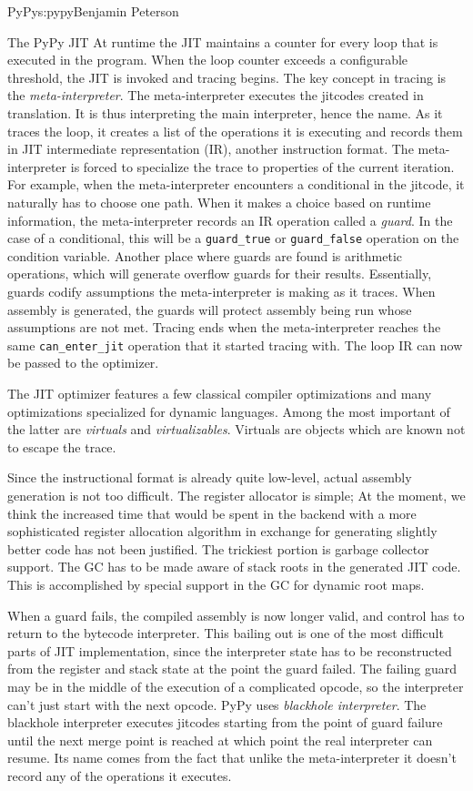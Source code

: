 \begin{aosachapter}{PyPy}{s:pypy}{Benjamin Peterson}
\begin{aosasect1}{The PyPy JIT}
At runtime the JIT maintains a counter for every loop that is executed in the
program. When the loop counter exceeds a configurable threshold, the JIT is
invoked and tracing begins. The key concept in tracing is the
\emph{meta-interpreter}. The meta-interpreter executes the jitcodes created in
translation. It is thus interpreting the main interpreter, hence the name. As it
traces the loop, it creates a list of the operations it is executing and records
them in JIT intermediate representation (IR), another instruction format. The
meta-interpreter is forced to specialize the trace to properties of the current
iteration. For example, when the meta-interpreter encounters a conditional in
the jitcode, it naturally has to choose one path. When it makes a choice based
on runtime information, the meta-interpreter records an IR operation called a
\emph{guard}. In the case of a conditional, this will be a \verb+guard_true+ or
\verb+guard_false+ operation on the condition variable. Another place where
guards are found is arithmetic operations, which will generate overflow guards
for their results. Essentially, guards codify assumptions the meta-interpreter
is making as it traces. When assembly is generated, the guards will protect
assembly being run whose assumptions are not met. Tracing ends when the
meta-interpreter reaches the same \verb+can_enter_jit+ operation that it started
tracing with. The loop IR can now be passed to the optimizer.

The JIT optimizer features a few classical compiler optimizations and many
optimizations specialized for dynamic languages. Among the most important of the
latter are \emph{virtuals} and \emph{virtualizables}. Virtuals are objects which
are known not to escape the trace.

Since the instructional format is already quite low-level, actual assembly
generation is not too difficult. The register allocator is simple; At the
moment, we think the increased time that would be spent in the backend with a
more sophisticated register allocation algorithm in exchange for generating
slightly better code has not been justified. The trickiest portion is garbage
collector support. The GC has to be made aware of stack roots in the generated
JIT code. This is accomplished by special support in the GC for dynamic root
maps.

When a guard fails, the compiled assembly is now longer valid, and control has
to return to the bytecode interpreter. This bailing out is one of the most
difficult parts of JIT implementation, since the interpreter state has to be
reconstructed from the register and stack state at the point the guard
failed. The failing guard may be in the middle of the execution of a complicated
opcode, so the interpreter can't just start with the next opcode. PyPy uses
\emph{blackhole interpreter}. The blackhole interpreter executes jitcodes
starting from the point of guard failure until the next merge point is reached
at which point the real interpreter can resume. Its name comes from the fact
that unlike the meta-interpreter it doesn't record any of the operations it
executes.


\end{aosasect1}
\end{aosachapter}

